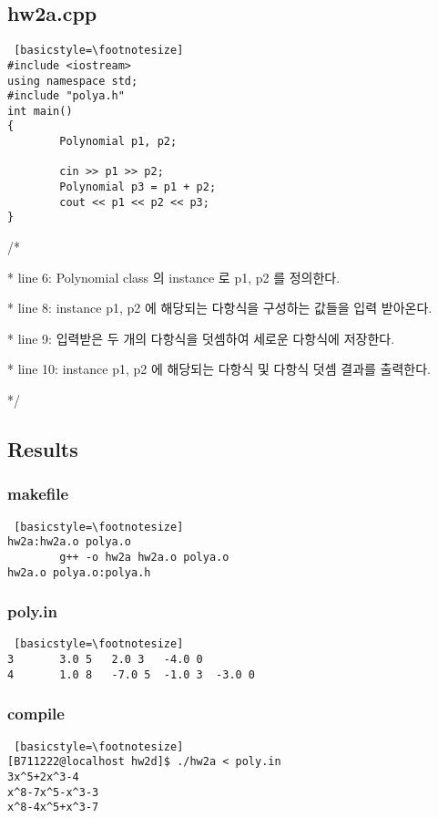 \documentclass[twoside,twocolumn]{article}
\newenvironment{itemizeReduced}{
\begin{list}{\labelitemi}{\leftmargin=1em}
\setlength{\itemsep}{1pt}
\setlength{\parskip}{0pt}
\setlength{\parsep}{0pt}}{\end{list}
}
\begin{document}
\newpage

\subsection{hw2a.cpp}
\begin{lstlisting} [basicstyle=\footnotesize]
#include <iostream>
using namespace std;
#include "polya.h"
int main()
{
        Polynomial p1, p2;

        cin >> p1 >> p2;
        Polynomial p3 = p1 + p2;
        cout << p1 << p2 << p3;
}
\end{lstlisting}
\begin{itemizeReduced}
    \item[/*]
    \item[*] line 6: Polynomial class 의 instance 로 p1, p2 를 정의한다.
    \item[*] line 8: instance p1, p2 에 해당되는 다항식을 구성하는 값들을 입력 받아온다.
    \item[*] line 9: 입력받은 두 개의 다항식을 덧셈하여 세로운 다항식에 저장한다.
    \item[*] line 10: instance p1, p2 에 해당되는 다항식 및 다항식 덧셈 결과를 출력한다.
\end{itemizeReduced}
*/

\subsection{Results}
\subsubsection{makefile}
\begin{lstlisting} [basicstyle=\footnotesize]
hw2a:hw2a.o polya.o
        g++ -o hw2a hw2a.o polya.o
hw2a.o polya.o:polya.h
\end{lstlisting}

\subsubsection{poly.in}
\begin{lstlisting} [basicstyle=\footnotesize]
3       3.0 5   2.0 3   -4.0 0
4       1.0 8   -7.0 5  -1.0 3  -3.0 0
\end{lstlisting}

\subsubsection{compile}
\begin{lstlisting} [basicstyle=\footnotesize]
[B711222@localhost hw2d]$ ./hw2a < poly.in
3x^5+2x^3-4
x^8-7x^5-x^3-3
x^8-4x^5+x^3-7
\end{lstlisting}
\end{document}
